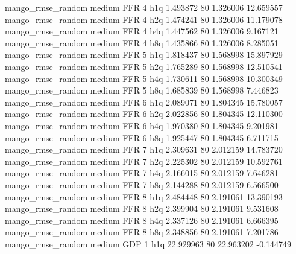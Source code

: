 mango_rmse_random     medium      FFR                 4                  h1q  1.493872 80       1.326006          12.659557
mango_rmse_random     medium      FFR                 4                  h2q  1.474241 80       1.326006          11.179078
mango_rmse_random     medium      FFR                 4                  h4q  1.447562 80       1.326006           9.167121
mango_rmse_random     medium      FFR                 4                  h8q  1.435866 80       1.326006           8.285051
mango_rmse_random     medium      FFR                 5                  h1q  1.818437 80       1.568998          15.897929
mango_rmse_random     medium      FFR                 5                  h2q  1.765289 80       1.568998          12.510541
mango_rmse_random     medium      FFR                 5                  h4q  1.730611 80       1.568998          10.300349
mango_rmse_random     medium      FFR                 5                  h8q  1.685839 80       1.568998           7.446823
mango_rmse_random     medium      FFR                 6                  h1q  2.089071 80       1.804345          15.780057
mango_rmse_random     medium      FFR                 6                  h2q  2.022856 80       1.804345          12.110300
mango_rmse_random     medium      FFR                 6                  h4q  1.970380 80       1.804345           9.201981
mango_rmse_random     medium      FFR                 6                  h8q  1.925447 80       1.804345           6.711715
mango_rmse_random     medium      FFR                 7                  h1q  2.309631 80       2.012159          14.783720
mango_rmse_random     medium      FFR                 7                  h2q  2.225302 80       2.012159          10.592761
mango_rmse_random     medium      FFR                 7                  h4q  2.166015 80       2.012159           7.646281
mango_rmse_random     medium      FFR                 7                  h8q  2.144288 80       2.012159           6.566500
mango_rmse_random     medium      FFR                 8                  h1q  2.484448 80       2.191061          13.390193
mango_rmse_random     medium      FFR                 8                  h2q  2.399904 80       2.191061           9.531608
mango_rmse_random     medium      FFR                 8                  h4q  2.337126 80       2.191061           6.666395
mango_rmse_random     medium      FFR                 8                  h8q  2.348856 80       2.191061           7.201786
mango_rmse_random     medium      GDP                 1                  h1q 22.929963 80      22.963202          -0.144749
